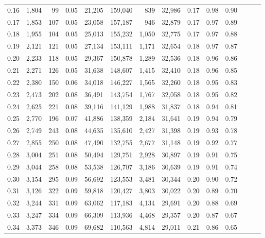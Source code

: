\begin{tabular}{rrrrrrrrrrrrrr}
0.16 &  1,804 &   99 &  0.05 &   21,205 &  159,040 &     839 &  32,986 &  0.17 &  0.98 &      0.90 \\
0.17 &  1,853 &  107 &  0.05 &   23,058 &  157,187 &     946 &  32,879 &  0.17 &  0.97 &      0.89 \\
0.18 &  1,955 &  104 &  0.05 &   25,013 &  155,232 &   1,050 &  32,775 &  0.17 &  0.97 &      0.88 \\
0.19 &  2,121 &  121 &  0.05 &   27,134 &  153,111 &   1,171 &  32,654 &  0.18 &  0.97 &      0.87 \\
0.20 &  2,233 &  118 &  0.05 &   29,367 &  150,878 &   1,289 &  32,536 &  0.18 &  0.96 &      0.86 \\
0.21 &  2,271 &  126 &  0.05 &   31,638 &  148,607 &   1,415 &  32,410 &  0.18 &  0.96 &      0.85 \\
0.22 &  2,380 &  150 &  0.06 &   34,018 &  146,227 &   1,565 &  32,260 &  0.18 &  0.95 &      0.83 \\
0.23 &  2,473 &  202 &  0.08 &   36,491 &  143,754 &   1,767 &  32,058 &  0.18 &  0.95 &      0.82 \\
0.24 &  2,625 &  221 &  0.08 &   39,116 &  141,129 &   1,988 &  31,837 &  0.18 &  0.94 &      0.81 \\
0.25 &  2,770 &  196 &  0.07 &   41,886 &  138,359 &   2,184 &  31,641 &  0.19 &  0.94 &      0.79 \\
0.26 &  2,749 &  243 &  0.08 &   44,635 &  135,610 &   2,427 &  31,398 &  0.19 &  0.93 &      0.78 \\
0.27 &  2,855 &  250 &  0.08 &   47,490 &  132,755 &   2,677 &  31,148 &  0.19 &  0.92 &      0.77 \\
0.28 &  3,004 &  251 &  0.08 &   50,494 &  129,751 &   2,928 &  30,897 &  0.19 &  0.91 &      0.75 \\
0.29 &  3,044 &  258 &  0.08 &   53,538 &  126,707 &   3,186 &  30,639 &  0.19 &  0.91 &      0.74 \\
0.30 &  3,154 &  295 &  0.09 &   56,692 &  123,553 &   3,481 &  30,344 &  0.20 &  0.90 &      0.72 \\
0.31 &  3,126 &  322 &  0.09 &   59,818 &  120,427 &   3,803 &  30,022 &  0.20 &  0.89 &      0.70 \\
0.32 &  3,244 &  331 &  0.09 &   63,062 &  117,183 &   4,134 &  29,691 &  0.20 &  0.88 &      0.69 \\
0.33 &  3,247 &  334 &  0.09 &   66,309 &  113,936 &   4,468 &  29,357 &  0.20 &  0.87 &      0.67 \\
0.34 &  3,373 &  346 &  0.09 &   69,682 &  110,563 &   4,814 &  29,011 &  0.21 &  0.86 &      0.65 \\

\end{tabular}
